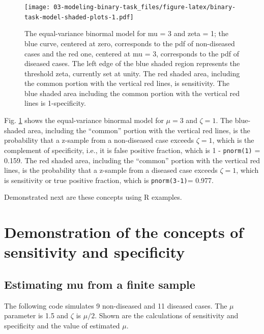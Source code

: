 \documentclass[
]{book}
\begin{document}
\begin{figure}
\centering
\texttt{[image: 03-modeling-binary-task\_files/figure-latex/binary-task-model-shaded-plots-1.pdf]}
\caption{\label{fig:binary-task-model-shaded-plots}The equal-variance binormal model for mu = 3 and zeta = 1; the blue curve, centered at zero, corresponds to the pdf of non-diseased cases and the red one, centered at mu = 3, corresponds to the pdf of diseased cases. The left edge of the blue shaded region represents the threshold zeta, currently set at unity. The red shaded area, including the common portion with the vertical red lines, is sensitivity. The blue shaded area including the common portion with the vertical red lines is 1-specificity.}
\end{figure}

Fig. \ref{fig:binary-task-model-shaded-plots} shows the equal-variance binormal model for \(\mu = 3\) and \(\zeta = 1\). The blue-shaded area, including the ``common'' portion with the vertical red lines, is the probability that a z-sample from a non-diseased case exceeds \(\zeta = 1\), which is the complement of specificity, i.e., it is false positive fraction, which is 1 - \texttt{pnorm(1)} = 0.159. The red shaded area, including the ``common'' portion with the vertical red lines, is the probability that a z-sample from a diseased case exceeds \(\zeta = 1\), which is sensitivity or true positive fraction, which is \texttt{pnorm(3-1)}= 0.977.

Demonstrated next are these concepts using R examples.

\hypertarget{binary-task-model-sensitivity-specificity-demo}{%
\section{Demonstration of the concepts of sensitivity and specificity}\label{binary-task-model-sensitivity-specificity-demo}}

\hypertarget{estimating-mu-from-a-finite-sample}{%
\subsection{Estimating mu from a finite sample}\label{estimating-mu-from-a-finite-sample}}

The following code simulates 9 non-diseased and 11 diseased cases. The \(\mu\) parameter is 1.5 and \(\zeta\) is \(\mu/2\). Shown are the calculations of sensitivity and specificity and the value of estimated \(\mu\).
\end{document}
